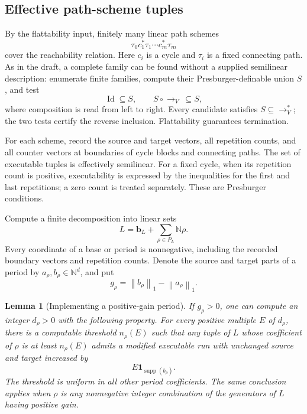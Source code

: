 \documentclass[11pt,a4paper]{article}
\newtheorem{lemma}[theorem]{Lemma}
\theoremstyle{remark}
\newcommand{\N}{\mathbb N}
\newcommand{\supp}{\operatorname{supp}}
\newcommand{\Id}{\operatorname{Id}}
\newcommand{\one}{\mathbf 1}
\newcommand{\norm}[1]{\left\lVert #1\right\rVert_1}
\newcommand{\reach}{\longrightarrow_V^*}
\newcommand{\step}{\longrightarrow_V}
\begin{document}
\subsection{Effective path-scheme tuples}

By the flattability input, finitely many linear path schemes
\[
 \tau_0c_1^*\tau_1\cdots c_m^*\tau_m
\]
cover the reachability relation. Here $c_i$ is a cycle and $\tau_i$ is a fixed connecting path. As in the draft, a complete family can be found without a supplied semilinear description: enumerate finite families, compute their Presburger-definable union $S$, and test
\[
 \Id\subseteq S,\qquad S\circ\step\ \subseteq S,
\]
where composition is read from left to right. Every candidate satisfies $S\subseteq\reach$; the two tests certify the reverse inclusion. Flattability guarantees termination.

For each scheme, record the source and target vectors, all repetition counts, and all counter vectors at boundaries of cycle blocks and connecting paths. The set of executable tuples is effectively semilinear. For a fixed cycle, when its repetition count is positive, executability is expressed by the inequalities for the first and last repetitions; a zero count is treated separately. These are Presburger conditions.

Compute a finite decomposition into linear sets
\begin{equation}\label{eq:linearset}
 L=\mathbf b_L+\sum_{\rho\in P_L}\N\rho.
\end{equation}
Every coordinate of a base or period is nonnegative, including the recorded boundary vectors and repetition counts. Denote the source and target parts of a period by $a_\rho,b_\rho\in\N^d$, and put
\[
 g_\rho=\norm{b_\rho}-\norm{a_\rho}.
\]

\begin{lemma}[Implementing a positive-gain period]\label{lem:period}
If $g_\rho>0$, one can compute an integer $d_\rho>0$ with the following property. For every positive multiple $E$ of $d_\rho$, there is a computable threshold $n_\rho(E)$ such that any tuple of $L$ whose coefficient of $\rho$ is at least $n_\rho(E)$ admits a modified executable run with unchanged source and target increased by
\[
 E\one_{\supp(b_\rho)}.
\]
The threshold is uniform in all other period coefficients. The same conclusion applies when $\rho$ is any nonnegative integer combination of the generators of $L$ having positive gain.
\end{lemma}
\end{document}
